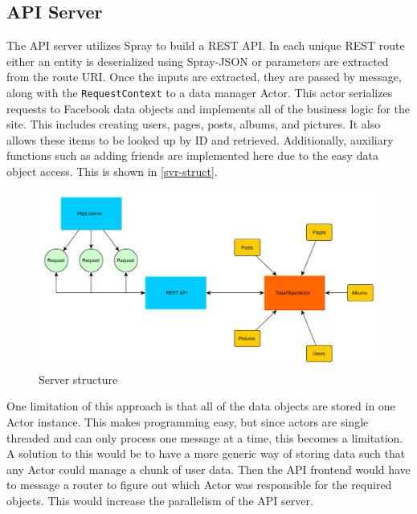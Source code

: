 \documentclass{article}
\begin{document}
\subsection*{API Server}
The API server utilizes Spray to build a REST API. In each unique REST route either an entity is deserialized using Spray-JSON or parameters are extracted from the route URI. Once the inputs are extracted, they are passed by message, along with the \texttt{RequestContext} to a data manager Actor. This actor serializes requests to Facebook data objects and implements all of the business logic for the site. This includes creating users, pages, posts, albums, and pictures. It also allows these items to be looked up by ID and retrieved. Additionally, auxiliary functions such as adding friends are implemented here due to the easy data object access. This is shown in \autoref{svr-struct}.

\begin{figure}[H]
  \centering
  \includegraphics[scale=0.5]{diagrams/server-structure.pdf}
  \caption{Server structure}
  \label{svr-struct}
\end{figure}

One limitation of this approach is that all of the data objects are stored in one Actor instance. This makes programming easy, but since actors are single threaded and can only process one message at a time, this becomes a limitation. A solution to this would be to have a more generic way of storing data such that any Actor could manage a chunk of user data. Then the API frontend would have to message a router to figure out which Actor was responsible for the required objects. This would increase the parallelism of the API server.
\end{document}

